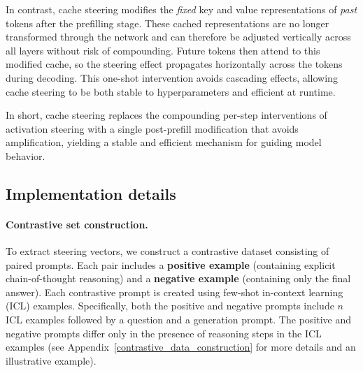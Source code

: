 \documentclass{article} %
\begin{document}
In contrast, cache steering modifies the \textit{fixed} key and value representations of \textit{past} tokens after the prefilling stage. These cached representations are no longer transformed through the network and can therefore be adjusted vertically across all layers without risk of compounding. Future tokens then attend to this modified cache, so the steering effect propagates horizontally across the tokens during decoding. This one-shot intervention avoids cascading effects, allowing cache steering to be both stable to hyperparameters and efficient at runtime.

In short, cache steering replaces the compounding per-step interventions of activation steering with a single post-prefill modification that avoids amplification, yielding a stable and efficient mechanism for guiding model behavior.


\subsection{Implementation details} \label{implementation_details}
\paragraph{Contrastive set construction.}

To extract steering vectors, we construct a contrastive dataset consisting of paired prompts. Each pair includes a \textbf{positive example} (containing explicit chain-of-thought reasoning) and a \textbf{negative example} (containing only the final answer). Each contrastive prompt is created using few-shot in-context learning (ICL) examples. Specifically, both the positive and negative prompts include \(n\) ICL examples followed by a question and a generation prompt. The positive and negative prompts differ only in the presence of reasoning steps in the ICL examples (see Appendix~\ref{contrastive_data_construction} for more details and an illustrative example).
\end{document}
